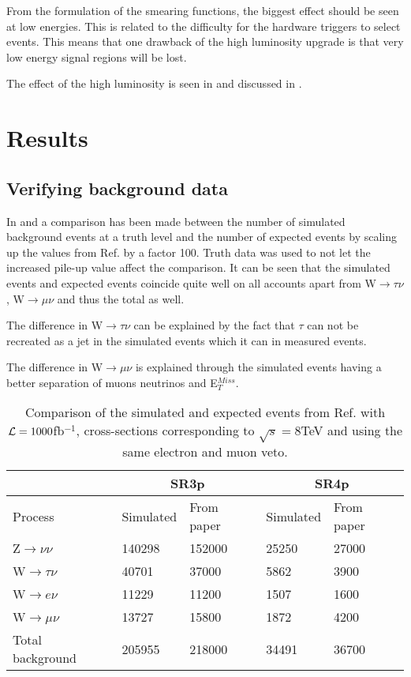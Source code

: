 From the formulation of the smearing functions, the biggest effect should be seen at low energies. This is related to the difficulty for the hardware triggers to select events. This means that one drawback of the high luminosity upgrade is that very low energy signal regions will be lost.

The effect of the high luminosity is seen in  and discussed in .

\newpage
\section{Results}\label{chap:sig:sec:res}
\subsection{Verifying background data}\label{Verifying background data}
In  and   a comparison has been made between the number of simulated background events at a truth level and the number of expected events by scaling up the values from Ref. \citep{ATLAS-CONF-2012-147} by a factor 100. Truth data was used to not let the increased pile-up value affect the comparison. It can be seen that the simulated events and expected events coincide quite well on all accounts apart from W$\rightarrow\tau\nu$, W$\rightarrow\mu\nu$ and thus the total as well. 

The difference in W$\rightarrow\tau\nu$ can be explained by the fact that $\tau$ can not be recreated as a jet in the simulated events which it can in measured events.

The difference in W$\rightarrow\mu\nu$ is explained through the simulated events having a better separation of muons neutrinos and E$_T^{Miss}$.

\begin{table}[ht]
\begin{center}
\begin{tabular}{|l|l|l|l|l|}
\hline
& \multicolumn{2}{c}{SR3p} & \multicolumn{2}{|c|}{SR4p} \\
\hline
Process & Simulated & From paper & Simulated & From paper \\ \hline
Z$\rightarrow\nu\nu$ & 140298 & 152000 & 25250 & 27000 \\
W$\rightarrow\tau\nu$ & 40701 & 37000 & 5862 & 3900 \\
W$\rightarrow e\nu$ & 11229 & 11200 & 1507 & 1600 \\
W$\rightarrow\mu\nu$ & 13727 & 15800 & 1872 & 4200 \\ \hline
Total background & 205955 & 218000 & 34491 & 36700 \\ \hline
\end{tabular}
\caption{Comparison of the simulated and expected events from Ref. \citep{ATLAS-CONF-2012-147} with $\mathcal{L}=1000$fb$^{-1}$, cross-sections corresponding to $\sqrt{s}=8$TeV and using the same electron and muon veto.}
\label{tab:Compare1}
\end{center}
\end{table}

